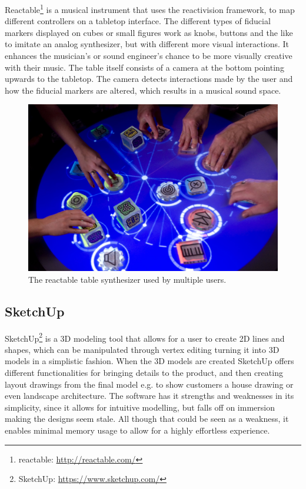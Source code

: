 			Reactable\footnote{reactable: \url{http://reactable.com/}} is a musical instrument that uses the reactivision framework, to map different controllers on a tabletop interface. The different types of fiducial markers displayed on cubes or small figures work as knobs, buttons and the like to imitate an analog synthesizer, but with different more visual interactions. It enhances the musician's or sound engineer's chance to be more visually creative with their music. The table itself consists of a camera at the bottom pointing upwards to the tabletop. The camera detects interactions made by the user and how the fiducial markers are altered, which results in a musical sound space.
				\begin{figure}[H]
					\centering
					\includegraphics[width=0.6\linewidth]{figure/Analysis/reactable}
					\caption{The reactable table synthesizer used by multiple users.}
					\label{fig:reactable}
				\end{figure} 
			
		
		\subsection{SketchUp}
			SketchUp\footnote{SketchUp: \url{https://www.sketchup.com/}} is a 3D modeling tool that allows for a user to create 2D lines and shapes, which can be manipulated through vertex editing turning it into 3D models in a simplistic fashion. When the 3D models are created SketchUp offers different functionalities for bringing details to the product, and then creating layout drawings from the final	model e.g. to show customers a house drawing or even landscape architecture. The software has it strengths and weaknesses in its simplicity, since it allows for intuitive modelling, but falls off on immersion making the designs seem stale. All though that could be seen as a weakness, it enables minimal memory usage to allow for a highly effortless experience. \\
			
